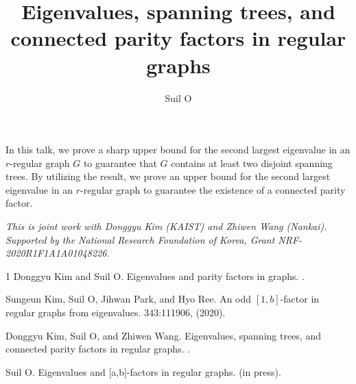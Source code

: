 \documentclass[a4paper]{amsart}
\date{}
\begin{document}
\title{Eigenvalues, spanning trees, and connected parity factors in regular graphs}
\author{Suil O} %
\address{SUNY-Korea} %

\maketitle


In this talk, we prove a sharp upper bound for the second largest eigenvalue in an $r$-regular graph $G$ to guarantee that $G$ contains at least two disjoint spanning trees. By utilizing the result, we prove an upper bound for the second largest eigenvalue in an $r$-regular graph to guarantee the existence of a connected parity factor.

\emph{This is joint work with Donggyu Kim (KAIST) and Zhiwen Wang (Nankai).
Supported by the National Research Foundation of Korea, Grant NRF-2020R1F1A1A01048226.}

\begin{thebibliography}{1}
Donggyu Kim and Suil O.
\newblock Eigenvalues and parity factors in graphs.
.

Sungeun Kim, Suil O, Jihwan Park, and Hyo Ree.
\newblock An odd $[1,b]$-factor in regular graphs from eigenvalues.
  343:111906,  (2020).

Donggyu Kim, Suil O, and Zhiwen Wang.
\newblock Eigenvalues, spanning trees, and connected parity factors in regular graphs.
.

Suil O.
\newblock Eigenvalues and [a,b]-factors in regular graphs.
 (in press).
\end{thebibliography}
\end{document}
